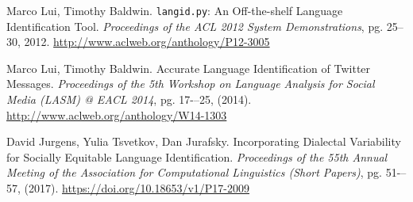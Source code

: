 \begin{thebibliography}{3}
 Marco Lui, Timothy Baldwin. {\tt langid.py}: An Off-the-shelf Language Identification Tool.
{\em Proceedings of the ACL 2012 System Demonstrations}, pg. 25--30, 2012.
\url{http://www.aclweb.org/anthology/P12-3005}

 Marco Lui, Timothy Baldwin. Accurate Language Identification of Twitter Messages. 
{\em Proceedings of the 5th Workshop on Language Analysis for Social Media (LASM) @ EACL 2014}, pg. 17-–25,
(2014). \url{http://www.aclweb.org/anthology/W14-1303}

 David Jurgens, Yulia Tsvetkov, Dan Jurafsky. Incorporating Dialectal Variability
for Socially Equitable Language Identification. 
{\em Proceedings of the 55th Annual Meeting of the Association for Computational Linguistics (Short Papers)}, 
pg. 51-–57, (2017). \url{https://doi.org/10.18653/v1/P17-2009}

\end{thebibliography}
